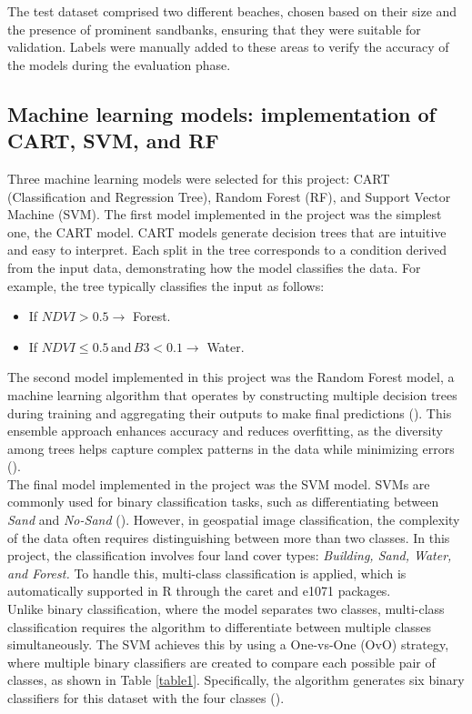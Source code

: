 \documentclass[a4paper,12pt]{article}
\begin{document}
The test dataset comprised two different beaches, chosen based on their size and the presence of prominent sandbanks, ensuring that they were suitable for validation. Labels were manually added to these areas to verify the accuracy of the models during the evaluation phase.



\subsection{Machine learning models: implementation of CART, SVM, and RF}
Three machine learning models were selected for this project: CART (Classification and Regression Tree), Random Forest (RF), and Support Vector Machine (SVM). 
The first model implemented in the project was the simplest one, the CART  model.
CART models generate decision trees that are intuitive and easy to interpret. Each split in the tree corresponds to a condition derived from the input data, demonstrating how the model classifies the data. For example, the tree typically classifies the input as follows:
\begin{itemize}
    \item If $NDVI > 0.5 \rightarrow$ Forest.
    \item If $NDVI \leq 0.5 \, \text{and} \, B3 < 0.1 \rightarrow$ Water.
\end{itemize}
The second model implemented in this project was the Random Forest model, a machine learning algorithm that operates by constructing multiple decision trees during training and aggregating their outputs to make final predictions (\cite{belgiu_random_2016}). This ensemble approach enhances accuracy and reduces overfitting, as the diversity among trees helps capture complex patterns in the data while minimizing errors (\cite{donges_random_2024}).\\
The final model implemented in the project was the SVM model.
SVMs are commonly used for binary classification tasks, such as differentiating between \textit{Sand} and \textit{No-Sand} (\cite{selvaraju_support_2021}). However, in geospatial image classification, the complexity of the data often requires distinguishing between more than two classes. In this project, the classification involves four land cover types: \textit{Building, Sand, Water, and Forest.} To handle this, multi-class classification is applied, which is automatically supported in R through the caret and e1071 packages.\\
Unlike binary classification, where the model separates two classes, multi-class classification requires the algorithm to differentiate between multiple classes simultaneously. The SVM achieves this by using a One-vs-One (OvO) strategy, where multiple binary classifiers are created to compare each possible pair of classes, as shown in Table \ref{table1}. Specifically, the algorithm generates six binary classifiers for this dataset with the four classes (\cite{xiao_enhancing_2021}).
\end{document}
